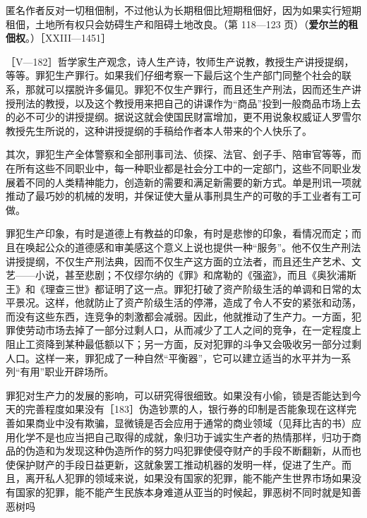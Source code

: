 匿名作者反对一切租佃制，不过他认为长期租佃比短期租佃好，因为如果实行短期租佃，土地所有权只会妨碍生产和阻碍土地改良。（第 118—123 页）（\textbf{爱尔兰的租佃权}。）［XXIII—1451］


［V—182］哲学家生产观念，诗人生产诗，牧师生产说教，教授生产讲授提纲，等等。罪犯生产罪行。如果我们仔细考察一下最后这个生产部门同整个社会的联系，那就可以摆脱许多偏见。罪犯不仅生产罪行，而且还生产刑法，因而还生产讲授刑法的教授，以及这个教授用来把自己的讲课作为“商品”投到一般商品市场上去的必不可少的讲授提纲。据说这就会使国民财富增加，更不用说象权威证人罗雪尔教授先生所说的，这种讲授提纲的手稿给作者本人带来的个人快乐了。

其次，罪犯生产全体警察和全部刑事司法、侦探、法官、刽子手、陪审官等等，而在所有这些不同职业中，每一种职业都是社会分工中的一定部门，这些不同职业发展着不同的人类精神能力，创造新的需要和满足新需要的新方式。单是刑讯一项就推动了最巧妙的机械的发明，并保证使大量从事刑具生产的可敬的手工业者有工可做。

罪犯生产印象，有时是道德上有教益的印象，有时是悲惨的印象，看情况而定；而且在唤起公众的道德感和审美感这个意义上说也提供一种“服务”。他不仅生产刑法讲授提纲，不仅生产刑法典，因而不仅生产这方面的立法者，而且还生产艺术、文艺——小说，甚至悲剧；不仅缪尔纳的《罪》和席勒的《强盗》，而且《奥狄浦斯王》和《理查三世》都证明了这一点。罪犯打破了资产阶级生活的单调和日常的太平景况。这样，他就防止了资产阶级生活的停滞，造成了令人不安的紧张和动荡，而没有这些东西，连竞争的刺激都会减弱。因此，他就推动了生产力。一方面，犯罪使劳动市场去掉了一部分过剩人口，从而减少了工人之间的竞争，在一定程度上阻止工资降到某种最低额以下；另一方面，反对犯罪的斗争又会吸收另一部分过剩人口。这样一来，罪犯成了一种自然“平衡器”，它可以建立适当的水平并为一系列“有用”职业开辟场所。

罪犯对生产力的发展的影响，可以研究得很细致。如果没有小偷，锁是否能达到今天的完善程度如果没有［183］伪造钞票的人，银行券的印制是否能象现在这样完善如果商业中没有欺骗，显微镜是否会应用于通常的商业领域（见拜比吉的书）应用化学不是也应当把自己取得的成就，象归功于诚实生产者的热情那样，归功于商品的伪造和为发现这种伪造所作的努力吗犯罪使侵夺财产的手段不断翻新，从而也使保护财产的手段日益更新，这就象罢工推动机器的发明一样，促进了生产。而且，离开私人犯罪的领域来说，如果没有国家的犯罪，能不能产生世界市场如果没有国家的犯罪，能不能产生民族本身难道从亚当的时候起，罪恶树不同时就是知善恶树吗

